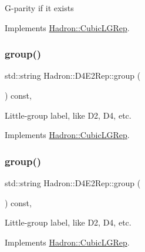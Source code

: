 G-\/parity if it exists 

Implements \mbox{\hyperlink{structHadron_1_1CubicLGRep_ace26f7b2d55e3a668a14cb9026da5231}{Hadron\+::\+Cubic\+L\+G\+Rep}}.

\mbox{\label{structHadron_1_1D4E2Rep_a7e858bda6dc247afd5e372ddbc3fcfe5}} 
\subsubsection{\texorpdfstring{group()}{group()}\hspace{0.1cm}{\footnotesize\ttfamily [1/3]}}
{\footnotesize\ttfamily std\+::string Hadron\+::\+D4\+E2\+Rep\+::group (\begin{DoxyParamCaption}{ }\end{DoxyParamCaption}) const\hspace{0.3cm}{\ttfamily [inline]}, {\ttfamily [virtual]}}

Little-\/group label, like D2, D4, etc. 

Implements \mbox{\hyperlink{structHadron_1_1CubicLGRep_a9bdb14b519a611d21379ed96a3a9eb41}{Hadron\+::\+Cubic\+L\+G\+Rep}}.

\mbox{\label{structHadron_1_1D4E2Rep_a7e858bda6dc247afd5e372ddbc3fcfe5}} 
\subsubsection{\texorpdfstring{group()}{group()}\hspace{0.1cm}{\footnotesize\ttfamily [2/3]}}
{\footnotesize\ttfamily std\+::string Hadron\+::\+D4\+E2\+Rep\+::group (\begin{DoxyParamCaption}{ }\end{DoxyParamCaption}) const\hspace{0.3cm}{\ttfamily [inline]}, {\ttfamily [virtual]}}

Little-\/group label, like D2, D4, etc. 

Implements \mbox{\hyperlink{structHadron_1_1CubicLGRep_a9bdb14b519a611d21379ed96a3a9eb41}{Hadron\+::\+Cubic\+L\+G\+Rep}}.

\mbox{\label{structHadron_1_1D4E2Rep_a7e858bda6dc247afd5e372ddbc3fcfe5}} 

